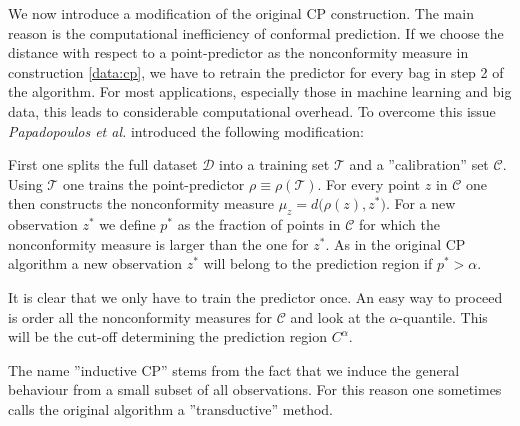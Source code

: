 {    We now introduce a modification of the original CP construction. The main reason is the computational inefficiency of conformal prediction. If we choose the distance with respect to a point-predictor as the nonconformity measure in construction \ref{data:cp}, we have to retrain the predictor for every bag in step 2 of the algorithm. For most applications, especially those in machine learning and big data, this leads to considerable computational overhead. To overcome this issue \textit{Papadopoulos et al.} introduced the following modification:
    \begin{construct}[Inductive CP]
        First one splits the full dataset $\mathcal{D}$ into a training set $\mathcal{T}$ and a ''calibration'' set $\mathcal{C}$. Using $\mathcal{T}$ one trains the point-predictor $\rho\equiv\rho(\mathcal{T})$. For every point $z$ in $\mathcal{C}$ one then constructs the nonconformity measure $\mu_z = d\big(\rho(z), z^*\big)$. For a new observation $z^*$ we define $p^*$ as the fraction of points in $\mathcal{C}$ for which the nonconformity measure is larger than the one for $z^*$. As in the original CP algorithm a new observation $z^*$ will belong to the prediction region if $p^*>\alpha$.
    \end{construct}
    It is clear that we only have to train the predictor once. An easy way to proceed is order all the nonconformity measures for $\mathcal{C}$ and look at the $\alpha$-quantile. This will be the cut-off determining the prediction region $C^\alpha$.

    \begin{remark}
        The name ''inductive CP'' stems from the fact that we induce the general behaviour from a small subset of all observations. For this reason one sometimes calls the original algorithm a ''transductive'' method.
    \end{remark}

}
